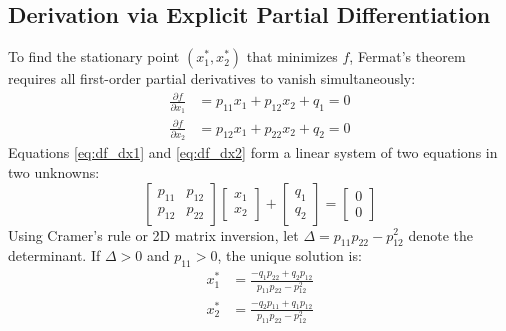 \documentclass[11pt,a4paper]{article}
\begin{document}
\subsection{Derivation via Explicit Partial Differentiation}
To find the stationary point $(x_1^*, x_2^*)$ that minimizes $f$, Fermat's theorem requires all first-order partial derivatives to vanish simultaneously:
\begin{align}
\frac{\partial f}{\partial x_1} &= p_{11} x_1 + p_{12} x_2 + q_1 = 0 \label{eq:df_dx1} \\
\frac{\partial f}{\partial x_2} &= p_{12} x_1 + p_{22} x_2 + q_2 = 0 \label{eq:df_dx2}
\end{align}
Equations \eqref{eq:df_dx1} and \eqref{eq:df_dx2} form a linear system of two equations in two unknowns:
\begin{equation}
\begin{bmatrix}
p_{11} & p_{12} \\
p_{12} & p_{22}
\end{bmatrix}
\begin{bmatrix}
x_1 \\
x_2
\end{bmatrix}
+
\begin{bmatrix}
q_1 \\
q_2
\end{bmatrix}
=
\begin{bmatrix}
0 \\
0
\end{bmatrix}
\label{eq:linear_sys_2d}
\end{equation}
Using Cramer's rule or 2D matrix inversion, let $\Delta = p_{11} p_{22} - p_{12}^2$ denote the determinant. If $\Delta > 0$ and $p_{11} > 0$, the unique solution is:
\begin{align}
x_1^* &= \frac{-q_1 p_{22} + q_2 p_{12}}{p_{11} p_{22} - p_{12}^2} \\
x_2^* &= \frac{-q_2 p_{11} + q_1 p_{12}}{p_{11} p_{22} - p_{12}^2}
\end{align}
\end{document}
